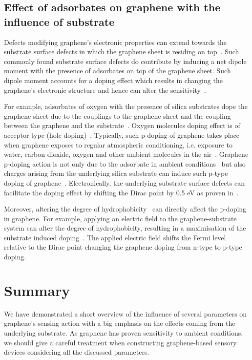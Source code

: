 \subsection{Effect of adsorbates on graphene with the influence of substrate}
Defects modifying graphene's electronic properties can extend towards the substrate surface defects in which the graphene sheet is residing on top~\cite{Wehling2008, Wehling2009, Elgammal2017}. Such commonly found substrate surface defects do contribute by inducing a net dipole moment with the presence of adsorbates on top of the graphene sheet. Such dipole moment accounts for a doping effect which results in changing the graphene's electronic structure and hence can alter the sensitivity~\cite{Wehling2008, Smith2015, Smith2017, Melios2017, Elgammal2017}. 

For example, adsorbates of oxygen with the presence of silica substrates dope the graphene sheet due to the couplings to the graphene sheet and the coupling between the graphene and the substrate~\cite{Ryu2010}. Oxygen molecules doping effect is of acceptor type (hole doping)~\cite{Liu2008}. Typically, such p-doping of graphene takes place when graphene exposes to regular atmospheric conditioning, i.e. exposure to water, carbon dioxide, oxygen and other ambient molecules in the air~\cite{Levesque2011, Anton2012}. Graphene p-doping action is not only due to the adsorbate in ambient conditions~\cite{Melios2017tuning} but also charges arising from the underlying silica substrate can induce such p-type doping of graphene~\cite{Melios2016}. Electronically, the underlying substrate surface defects can facilitate the doping effect by shifting the Dirac point by 0.5 eV as proven in~\cite{Levesque2011}. 

Moreover, altering the degree of hydrophobicity~\cite{Chen2014, Belyaeva2017} can directly affect the p-doping in graphene. For example, applying an electric field to the graphene-substrate system can alter the degree of hydrophobicity, resulting in a maximisation of the substrate induced doping~\cite{Hong2016}. The applied electric field shifts the Fermi level relative to the Dirac point changing the graphene doping from n-type to p-type doping.  
%
%
\section{Summary}
We have demonstrated a short overview of the influence of several parameters on graphene's sensing action with a big emphasis on the effects coming from the underlying substrate. As graphene has proven sensitivity to ambient conditions, we should give a careful treatment when constructing graphene-based sensory devices considering all the discussed parameters.
